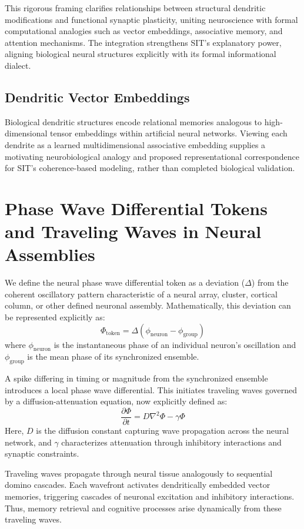 \documentclass[american,11pt,letterpaper]{article}
\def\emph#1{#1}%
\begin{document}
This rigorous framing clarifies relationships between structural dendritic modifications and functional synaptic plasticity, uniting neuroscience with formal computational analogies such as vector embeddings, associative memory, and attention mechanisms. The integration strengthens SIT's explanatory power, aligning biological neural structures explicitly with its formal informational dialect.

\subsection{Dendritic Vector Embeddings}

Biological dendritic structures encode relational memories analogous to high-dimensional tensor embeddings within artificial neural networks. Viewing each dendrite as a learned multidimensional associative embedding supplies a motivating neurobiological analogy and proposed representational correspondence for SIT's coherence-based modeling, rather than completed biological validation.

\section{Phase Wave Differential Tokens and Traveling Waves in Neural Assemblies}

We define the neural \emph{phase wave differential token} as a deviation ($\Delta$) from the coherent oscillatory pattern characteristic of a neural array, cluster, cortical column, or other defined neuronal assembly. Mathematically, this deviation can be represented explicitly as:
\[
\Phi_{\text{token}} = \Delta (\phi_{\text{neuron}} - \phi_{\text{group}})
\]
where $\phi_{\text{neuron}}$ is the instantaneous phase of an individual neuron's oscillation and $\phi_{\text{group}}$ is the mean phase of its synchronized ensemble.

A spike differing in timing or magnitude from the synchronized ensemble introduces a local \emph{phase wave differential}. This initiates traveling waves governed by a diffusion-attenuation equation, now explicitly defined as:
\[
\frac{\partial \Phi}{\partial t} = D \nabla^2 \Phi - \gamma \Phi
\]
Here, $D$ is the diffusion constant capturing wave propagation across the neural network, and $\gamma$ characterizes attenuation through inhibitory interactions and synaptic constraints.

Traveling waves propagate through neural tissue analogously to sequential domino cascades. Each wavefront activates dendritically embedded vector memories, triggering cascades of neuronal excitation and inhibitory interactions. Thus, memory retrieval and cognitive processes arise dynamically from these traveling waves.
\end{document}
